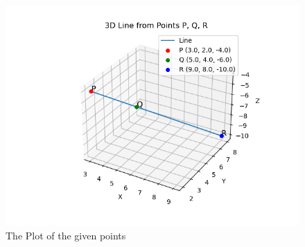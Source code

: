 \documentclass[journal]{IEEEtran}
\begin{document}
		\begin{figure}
    \centering
    \includegraphics[width=\linewidth]{figs/fig.png}
    \caption{The Plot of the given points}
    \label{fig:your_label}
		\end{figure}
\end{document}
